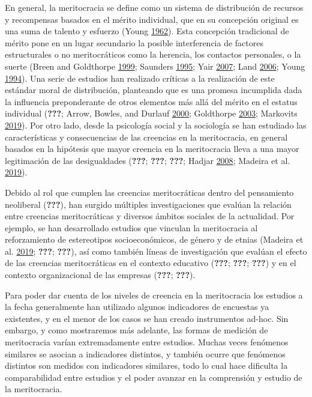 \documentclass[
]{article}
\begin{document}
En general, la meritocracia se define como un sistema de distribución de recursos y recompensas basados en el mérito individual, que en su concepción original es una suma de talento y esfuerzo (Young \protect\hyperlink{ref-young_rise_1962}{1962}). Esta concepción tradicional de mérito pone en un lugar secundario la posible interferencia de factores estructurales o no meritocráticos como la herencia, los contactos personales, o la suerte (Breen and Goldthorpe \protect\hyperlink{ref-breenClassInequalityMeritocracy1999}{1999}; Saunders \protect\hyperlink{ref-saundersMightBritainBe1995}{1995}; Yair \protect\hyperlink{ref-yairMeritocracy2007}{2007}; Land \protect\hyperlink{ref-landWeSatTable2006}{2006}; Young \protect\hyperlink{ref-youngRiseMeritocracy1994}{1994}). Una serie de estudios han realizado críticas a la realización de este estándar moral de distribución, planteando que es una promesa incumplida dada la influencia preponderante de otros elementos más allá del mérito en el estatus individual ({\textbf{???}}; Arrow, Bowles, and Durlauf \protect\hyperlink{ref-arrow_meritocracy_2000}{2000}; Goldthorpe \protect\hyperlink{ref-goldthorpe_myth_2003}{2003}; Markovits \protect\hyperlink{ref-markovits_Meritocracy_2019}{2019}). Por otro lado, desde la psicología social y la sociología se han estudiado las características y consecuencias de las creencias en la meritocracia, en general basados en la hipótesis que mayor creencia en la meritocracia lleva a una mayor legitimación de las desigualdades ({\textbf{???}}; {\textbf{???}}; {\textbf{???}}; Hadjar \protect\hyperlink{ref-hadjar_meritokratie_2008}{2008}; Madeira et al. \protect\hyperlink{ref-MadeiraPrimesConsequencesSystematic2019}{2019}).

Debido al rol que cumplen las creencias meritocráticas dentro del pensamiento neoliberal ({\textbf{???}}), han surgido múltiples investigaciones que evalúan la relación entre creencias meritocráticas y diversos ámbitos sociales de la actualidad. Por ejemplo, se han desarrollado estudios que vinculan la meritocracia al reforzamiento de estereotipos socioeconómicos, de género y de etnias (Madeira et al. \protect\hyperlink{ref-MadeiraPrimesConsequencesSystematic2019}{2019}; {\textbf{???}}; {\textbf{???}}), así como también líneas de investigación que evalúan el efecto de las creencias meritocráticas en el contexto educativo ({\textbf{???}}; {\textbf{???}}; {\textbf{???}}) y en el contexto organizacional de las empresas ({\textbf{???}}; {\textbf{???}}).

Para poder dar cuenta de los niveles de creencia en la meritocracia los estudios a la fecha generalmente han utilizado algunos indicadores de encuestas ya existentes, y en el menor de los casos se han creado instrumentos ad-hoc. Sin embargo, y como mostraremos más adelante, las formas de medición de meritocracia varían extremadamente entre estudios. Muchas veces fenómenos similares se asocian a indicadores distintos, y también ocurre que fenómenos distintos son medidos con indicadores similares, todo lo cual hace dificulta la comparabilidad entre estudios y el poder avanzar en la comprensión y estudio de la meritocracia.
\end{document}
